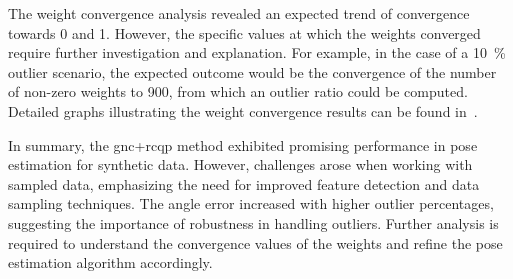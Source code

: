 The weight convergence analysis revealed an expected trend of convergence towards \num{0} and \num{1}. However, the specific values at which the weights converged require further investigation and explanation. For example, in the case of a \SI{10}{\percent} outlier scenario, the expected outcome would be the convergence of the number of non-zero weights to \num{900}, from which an outlier ratio could be computed. Detailed graphs illustrating the weight convergence results can be found in~.\medskip

In summary, the \gls{gnc}+\gls{rcqp} method exhibited promising performance in pose estimation for synthetic data. However, challenges arose when working with sampled data, emphasizing the need for improved feature detection and data sampling techniques. The angle error increased with higher outlier percentages, suggesting the importance of robustness in handling outliers. Further analysis is required to understand the convergence values of the weights and refine the pose estimation algorithm accordingly.